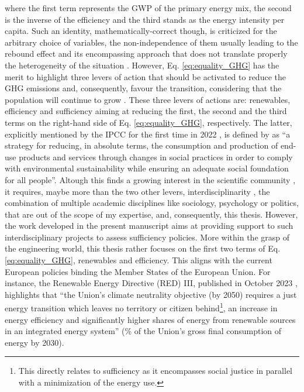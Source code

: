 \noindent
where the first term represents the \gls{GWP} of the primary energy mix, the second is the inverse of the efficiency and the third stands as the energy intensity per capita. Such an identity, mathematically-correct though, is criticized for the arbitrary choice of variables, the non-independence of them usually leading to the rebound effect and its encompassing approach that does not translate properly the heterogeneity of the situation \cite{IPCC2000}. However, Eq. \ref{eq:equality_GHG} has the merit to highlight three levers of action that should be activated to reduce the \gls{GHG} emissions and, consequently, favour the transition, considering that the population will continue to grow \cite{dodson2020population,scovronick2017impact}. These three levers of actions are: renewables, efficiency and sufficiency aiming at reducing the first, the second and the third terms on the right-hand side of Eq. \ref{eq:equality_GHG}, respectively. The latter, explicitly mentioned by the IPCC for the first time in 2022 \cite{IPCC2022}, is defined by \citet{lage2023citizens} as ``a strategy for reducing, in absolute terms, the consumption and production of end-use products and services through changes in social practices in order to comply with environmental sustainability while ensuring an adequate social foundation for all people''. Altough this finds a growing interest in the scientific community \cite{o2018good}, it requires, maybe more than the two other levers, interdisciplinarity \cite{schmidt2015interdisciplinary}, \ie the combination of multiple academic disciplines like sociology, psychology or politics, that are out of the scope of my expertise, and, consequently, this thesis. However, the work developed in the present manuscript aims at providing support to such interdisciplinary projects to assess sufficiency policies. More within the grasp of the engineering world, this thesis rather focuses on the first two terms of Eq. \ref{eq:equality_GHG}, \ie renewables and efficiency. This aligns with the current European policies binding the Member States of the European Union. For instance, the Renewable Energy Directive (RED) III, published in October 2023 \cite{REDIII}, highlights that ``the Union’s climate neutrality objective (by 2050) requires a just energy transition which leaves no territory or citizen behind\footnote{This directly relates to sufficiency as it encompasses social justice in parallel with a minimization of the energy use.}, an increase in energy efficiency and significantly higher shares of energy from renewable sources in an integrated energy system'' (\% of the Union's gross final consumption of energy by 2030). 


